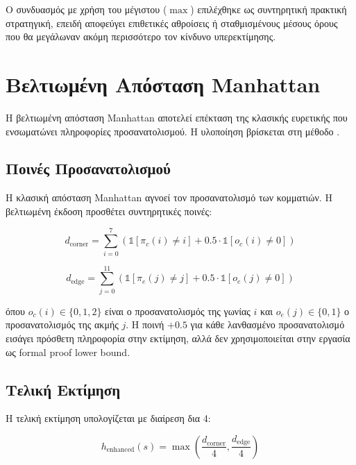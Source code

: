 Ο συνδυασμός με χρήση του μέγιστου ($\max$) επιλέχθηκε ως συντηρητική πρακτική
στρατηγική, επειδή αποφεύγει επιθετικές αθροίσεις ή σταθμισμένους μέσους όρους
που θα μεγάλωναν ακόμη περισσότερο τον κίνδυνο υπερεκτίμησης.

\section{Βελτιωμένη Απόσταση Manhattan}
\label{sec:enhanced-manhattan}

Η βελτιωμένη απόσταση Manhattan αποτελεί επέκταση της κλασικής ευρετικής που
ενσωματώνει πληροφορίες προσανατολισμού. Η υλοποίηση βρίσκεται στη μέθοδο
.

\subsection{Ποινές Προσανατολισμού}
\label{subsec:orientation-penalties}

Η κλασική απόσταση Manhattan αγνοεί τον προσανατολισμό των κομματιών. Η βελτιωμένη έκδοση προσθέτει συντηρητικές ποινές:

\begin{equation}
\label{eq:enhanced-corner}
d_{\text{corner}} = \sum_{i=0}^{7} \left( \mathbb{1}[\pi_c(i) \neq i] + 0.5 \cdot \mathbb{1}[o_c(i) \neq 0] \right)
\end{equation}

\begin{equation}
\label{eq:enhanced-edge}
d_{\text{edge}} = \sum_{j=0}^{11} \left( \mathbb{1}[\pi_e(j) \neq j] + 0.5 \cdot \mathbb{1}[o_e(j) \neq 0] \right)
\end{equation}

όπου $o_c(i) \in \{0, 1, 2\}$ είναι ο προσανατολισμός της γωνίας $i$ και
$o_e(j) \in \{0, 1\}$ ο προσανατολισμός της ακμής $j$. Η ποινή $+0.5$ για κάθε
λανθασμένο προσανατολισμό εισάγει πρόσθετη πληροφορία στην εκτίμηση, αλλά δεν
χρησιμοποιείται στην εργασία ως formal proof lower bound.

\subsection{Τελική Εκτίμηση}
\label{subsec:enhanced-final}

Η τελική εκτίμηση υπολογίζεται με διαίρεση δια 4:

\begin{equation}
\label{eq:enhanced-final}
h_{\text{enhanced}}(s) = \max\left( \frac{d_{\text{corner}}}{4}, \frac{d_{\text{edge}}}{4} \right)
\end{equation}

